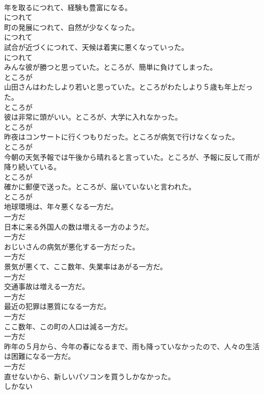 \documentclass[8pt]{extreport}
\begin{document}
\begin{CJK}{UTF8}{min}
\\	年を取るにつれて、経験も豊富になる。	
\\	につれて
\\	町の発展につれて、自然が少なくなった。	
\\	につれて
\\	試合が近づくにつれて、天候は着実に悪くなっていった。	
\\	につれて
\\	みんな彼が勝つと思っていた。ところが、簡単に負けてしまった。	
\\	ところが
\\	山田さんはわたしより若いと思っていた。ところがわたしより５歳も年上だった。	
\\	ところが
\\	彼は非常に頭がいい。ところが、大学に入れなかった。	
\\	ところが
\\	昨夜はコンサートに行くつもりだった。ところが病気で行けなくなった。	
\\	ところが
\\	今朝の天気予報では午後から晴れると言っていた。ところが、予報に反して雨が降り続いている。	
\\	ところが
\\	確かに郵便で送った。ところが、届いていないと言われた。	
\\	ところが
\\	地球環境は、年々悪くなる一方だ。	
\\	一方だ
\\	日本に来る外国人の数は増える一方のようだ。	
\\	一方だ
\\	おじいさんの病気が悪化する一方だった。	
\\	一方だ
\\	景気が悪くて、ここ数年、失業率はあがる一方だ。	
\\	一方だ
\\	交通事故は増える一方だ。	
\\	一方だ
\\	最近の犯罪は悪質になる一方だ。	
\\	一方だ
\\	ここ数年、この町の人口は減る一方だ。	
\\	一方だ
\\	昨年の５月から、今年の春になるまで、雨も降っていなかったので、人々の生活は困難になる一方だ。	
\\	一方だ
\\	直せないから、新しいパソコンを買うしかなかった。	
\\	しかない

\end{CJK}
\end{document}

